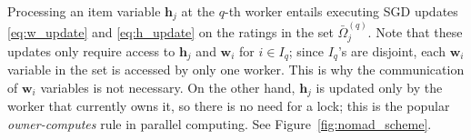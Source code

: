 \documentclass{vldb}
\newcommand{\hb}{\mathbf{h}}
\newcommand{\wb}{\mathbf{w}}
\newcommand{\Omegabar}{\bar{\Omega}}
\begin{document}
Processing an item variable $\hb_j$ at the $q$-th worker entails
executing SGD updates \eqref{eq:w_update} and \eqref{eq:h_update} on the
ratings in the set $\Omegabar_{j}^{(q)}$.  Note that these updates only
require access to $\hb_{j}$ and $\wb_i$ for $i \in I_q$; since $I_q$'s
are disjoint, each $\wb_i$ variable in the set is accessed by only one
worker.  This is why the communication of $\wb_i$ variables is not
necessary.  On the other hand, $\hb_j$ is updated only by the worker
that currently owns it, so there is no need for a lock; this is the
popular \emph{owner-computes} rule in parallel computing.  See
Figure~\ref{fig:nomad_scheme}.









\begin{figure}[htbp]




















  \begin{subfigure}[t]{0.22\textwidth}
    \centering
\end{subfigure}
\end{figure}
\end{document}
